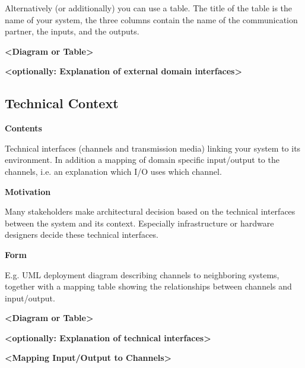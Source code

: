 Alternatively (or additionally) you can use a table. The title of the
table is the name of your system, the three columns contain the name of
the communication partner, the inputs, and the outputs.

\textbf{\textless Diagram or Table\textgreater{}}

\textbf{\textless optionally: Explanation of external domain
interfaces\textgreater{}}

\hypertarget{_technical_context}{%
\subsection{Technical Context}\label{_technical_context}}

\textbf{Contents}

Technical interfaces (channels and transmission media) linking your
system to its environment. In addition a mapping of domain specific
input/output to the channels, i.e. an explanation which I/O uses which
channel.

\textbf{Motivation}

Many stakeholders make architectural decision based on the technical
interfaces between the system and its context. Especially infrastructure
or hardware designers decide these technical interfaces.

\textbf{Form}

E.g. UML deployment diagram describing channels to neighboring systems,
together with a mapping table showing the relationships between channels
and input/output.

\textbf{\textless Diagram or Table\textgreater{}}

\textbf{\textless optionally: Explanation of technical
interfaces\textgreater{}}

\textbf{\textless Mapping Input/Output to Channels\textgreater{}}
